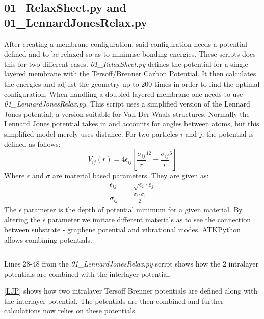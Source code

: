 \subsection{01\_RelaxSheet.py and 01\_LennardJonesRelax.py}\label{01}
After creating a membrane configuration, said configuration needs a potential defined and to be relaxed so as to minimise bonding energies. These scripts does this for two different cases. \textit{01\_RelaxSheet.py} defines the potential for a single layered membrane with the Tersoff/Brenner Carbon Potential\cite{Lindsay2010}. It then calculates the energies and adjust the geometry up to 200 times in order to find the optimal configuration. When handling a doubled layered membrane one needs to use \textit{01\_LennardJonesRelax.py}. This script uses a simplified version of the Lennard Jones potential; a version suitable for Van Der Waals structures. Normally the Lennard Jones potential takes in and accounts for angles between atoms, but this simplified model merely uses distance. For two particles $i$ and $j$, the potential is defined as follows:
\begin{equation}
  V_{ij}(r) = 4 \epsilon_{ij} \left[ \frac{\sigma_{ij}}{r}^{12} - \frac{\sigma_{ij}}{r}^6 \right]
\end{equation}
Where $\epsilon$ and $\sigma$ are material based parameters. They are given as:
\begin{align}
  \epsilon_{ij} & = \sqrt{\epsilon_i \cdot \epsilon_j} \\
  \sigma_{ij} & = \frac{\sigma_i \cdot \sigma_j}{2}
\end{align}
The $\epsilon$ parameter is the depth of potential minimum for a given material.
By altering the $\epsilon$ parameter we imitate different materials as to see the connection between substrate - graphene potential and vibrational modes.
ATKPython allows combining potentials.
\onecolumngrid

\begin{listing}[H]
 \inputminted[python3=true,bgcolor=Black,linenos=true,firstline=28,lastline=48]{python}{VNL/PythonScripts/Scripts/01_LennardJonesRelax.py}
 \caption{Lines 28-48 from the \textit{01\_LennardJonesRelax.py} script shows how the 2 intralayer potentials are combined with the interlayer potential.}
 \label{LJP}
\end{listing}
\twocolumngrid
\cref{LJP} shows how two intralayer Tersoff Brenner potentials are defined along with the interlayer potential. The potentials are then combined and further calculations now relies on these potentials.
